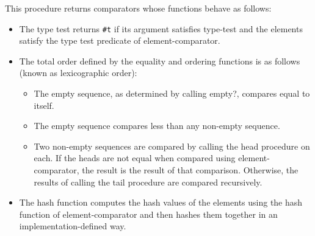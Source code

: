 \begin{entry}{%
  }

  This procedure returns comparators whose functions behave as
  follows: 

  \begin{itemize}
  \item The type test returns \texttt{\#t} if its argument satisfies
    type-test and the elements satisfy the type test predicate of
    element-comparator.
  \item The total order defined by the equality and ordering functions
    is as follows (known as lexicographic order):

  \begin{itemize}
    \tightlist
  \item The empty sequence, as determined by calling empty?, compares
    equal to itself.
  \item The empty sequence compares less than any non-empty sequence.
  \item Two non-empty sequences are compared by calling the head
    procedure on each. If the heads are not equal when compared using
    element-comparator, the result is the result of that comparison.
    Otherwise, the results of calling the tail procedure are compared
    recursively.
  \end{itemize}
\item The hash function computes the hash values of the elements using
  the hash function of element-comparator and then hashes them
  together in an implementation-defined way.
\end{itemize}
\end{entry}

